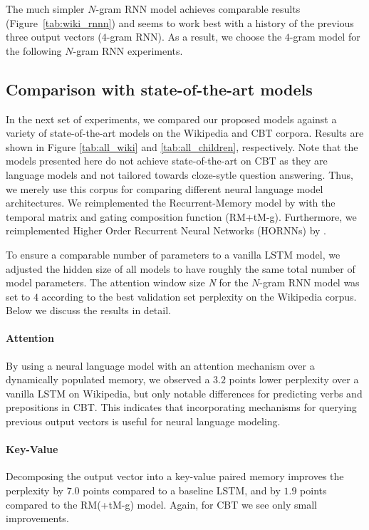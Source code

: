 \documentclass{article}
\begin{document}
The much simpler $N$-gram RNN model achieves comparable results (Figure~\ref{tab:wiki_rnnn}) and seems to work best with a history of the previous three output vectors ($4$-gram RNN).
As a result, we choose the $4$-gram model for the following $N$-gram RNN experiments.

\subsection{Comparison with state-of-the-art models}
In the next set of experiments, we compared our proposed models against a variety of state-of-the-art models on the Wikipedia and CBT corpora. 
Results are shown in Figure \ref{tab:all_wiki}  and \ref{tab:all_children}, respectively.
Note that the models presented here do not achieve state-of-the-art on CBT as they are language models and not tailored towards cloze-sytle question answering. 
Thus, we merely use this corpus for comparing different neural language model architectures.
We reimplemented the Recurrent-Memory model by \cite{tran2016recurrent} with the temporal matrix and gating composition function (RM+tM-g). 
Furthermore, we reimplemented Higher Order Recurrent Neural Networks (HORNNs) by \cite{soltani2016higher}. 

To ensure a comparable number of parameters to a vanilla LSTM model, we adjusted the hidden size of all models to have roughly the same total number of model parameters. 
The attention window size \textit{N} for the $N$-gram RNN model was set to $4$ according to the best validation set perplexity on the Wikipedia corpus.
Below we discuss the results in detail.

\paragraph{Attention} By using a neural language model with an attention mechanism over a dynamically populated memory, we observed a $3.2$ points lower perplexity over a vanilla LSTM on Wikipedia, but only notable differences for predicting verbs and prepositions in CBT. 
This indicates that incorporating mechanisms for querying previous output vectors is useful for neural language modeling.

\paragraph{Key-Value} Decomposing the output vector into a key-value paired memory improves the perplexity by $7.0$ points compared to a baseline LSTM, and by $1.9$ points compared to the RM(+tM-g) model. Again, for CBT we see only small improvements.
\end{document}
